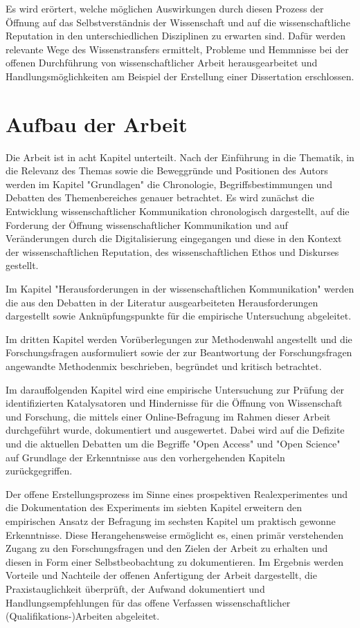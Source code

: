 Es wird erörtert, welche möglichen Auswirkungen durch diesen Prozess der Öffnung auf das Selbstverständnis der Wissenschaft und auf die wissenschaftliche Reputation in den unterschiedlichen Disziplinen zu erwarten sind. Dafür werden relevante Wege des Wissenstransfers ermittelt, Probleme und Hemmnisse bei der offenen Durchführung von wissenschaftlicher Arbeit herausgearbeitet und Handlungsmöglichkeiten am Beispiel der Erstellung einer Dissertation erschlossen.

\section{Aufbau der Arbeit}

Die Arbeit ist in acht Kapitel unterteilt. Nach der Einführung in die Thematik, in die Relevanz des Themas sowie die Beweggründe und Positionen des Autors werden im Kapitel "Grundlagen" die Chronologie, Begriffsbestimmungen und Debatten des Themenbereiches genauer betrachtet. Es wird zunächst die Entwicklung wissenschaftlicher Kommunikation chronologisch dargestellt, auf die Forderung der Öffnung wissenschaftlicher Kommunikation und auf Veränderungen durch die  Digitalisierung eingegangen und diese in den Kontext der wissenschaftlichen Reputation, des wissenschaftlichen Ethos und Diskurses gestellt.

Im Kapitel "Herausforderungen in der wissenschaftlichen Kommunikation" werden die aus den Debatten in der Literatur ausgearbeiteten Herausforderungen dargestellt sowie Anknüpfungspunkte für die empirische Untersuchung abgeleitet.

Im dritten Kapitel werden Vorüberlegungen zur Methodenwahl angestellt und die Forschungsfragen ausformuliert sowie der zur Beantwortung der Forschungsfragen angewandte Methodenmix beschrieben, begründet und kritisch betrachtet.

Im darauffolgenden Kapitel wird eine empirische Untersuchung zur Prüfung der identifizierten Katalysatoren und Hindernisse für die Öffnung von Wissenschaft und Forschung, die mittels einer Online-Befragung im Rahmen dieser Arbeit durchgeführt wurde, dokumentiert und ausgewertet. Dabei wird auf die Defizite und die aktuellen Debatten um die Begriffe "Open Access" und "Open Science" auf Grundlage der Erkenntnisse aus den vorhergehenden Kapiteln zurückgegriffen.

Der offene Erstellungsprozess im Sinne eines prospektiven Realexperimentes und die Dokumentation des Experiments im siebten Kapitel erweitern den empirischen Ansatz der Befragung im sechsten Kapitel um praktisch gewonne Erkenntnisse. Diese Herangehensweise ermöglicht es, einen primär verstehenden Zugang zu den Forschungsfragen und den Zielen der Arbeit zu erhalten und diesen in Form einer Selbstbeobachtung zu dokumentieren. Im Ergebnis werden Vorteile und Nachteile der offenen Anfertigung der Arbeit dargestellt, die Praxistauglichkeit überprüft, der Aufwand dokumentiert und Handlungsempfehlungen für das offene Verfassen wissenschaftlicher (Qualifikations-)Arbeiten abgeleitet.

